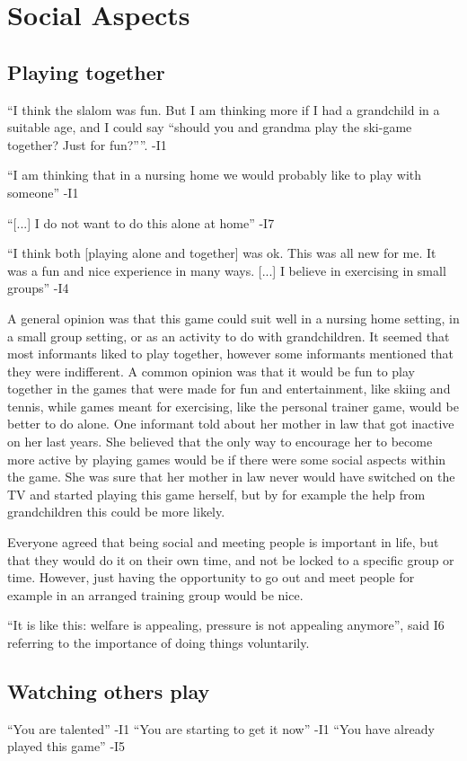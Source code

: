 \section{Social Aspects}
\subsection{Playing together}
“I think the slalom was fun. But I am thinking more if I had a grandchild in a suitable age, and I could say “should you and grandma play the ski-game together? Just for fun?””. -I1

“I am thinking that in a nursing home we would probably like to play with someone” -I1

“[...] I do not want to do this alone at home” -I7

“I think both [playing alone and together] was ok. This was all new for me. It was a fun and nice experience in many ways. [...] I believe in  exercising in small groups” -I4

A general opinion was that this game could suit well in a nursing home setting, in a small group setting, or as an activity to do with grandchildren. It seemed that most informants liked to play together, however some informants mentioned that they were indifferent. A common opinion was that it would be fun to play together in the games that were made for fun and entertainment, like skiing and tennis, while games meant for exercising, like the personal trainer game, would be better to do alone. One informant told about her mother in law that got inactive on her last years. She believed that the only way to encourage her to become more active by playing games would be if there were some social aspects within the game. She was sure that her mother in law never would have switched on the TV and started playing this game herself, but by for example the help from grandchildren this could be more likely.

Everyone agreed that being social and meeting people is important in life, but that they would do it on their own time, and not be locked to a specific group or time. However, just having the opportunity to go out and meet people for example in an arranged training group would be nice. 

“It is like this: welfare is appealing, pressure is not appealing anymore”, said I6 referring to the importance of doing things voluntarily. 

\subsection{Watching others play}
“You are talented” -I1
“You are starting to get it now” -I1
“You have already played this game” -I5

